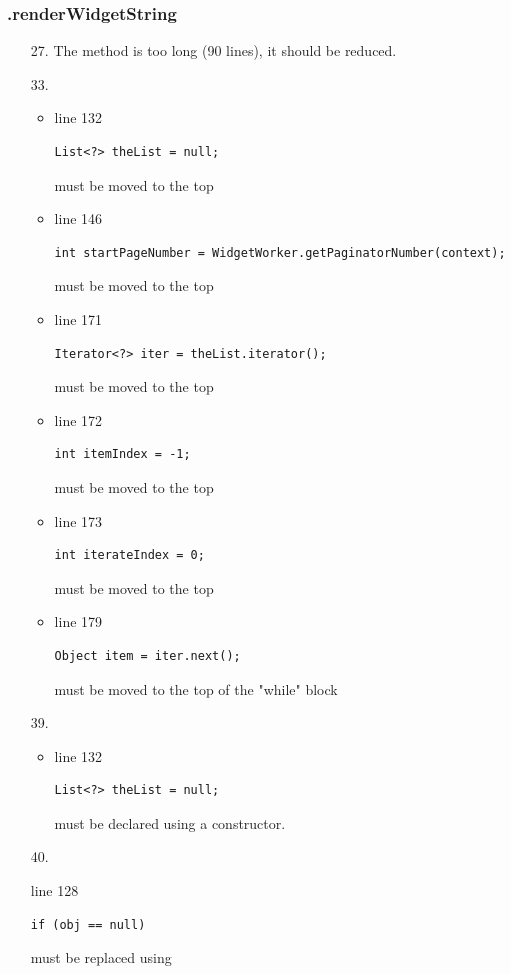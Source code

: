 \documentclass[english]{article}
\begin{document}
\subsubsection*{.renderWidgetString}
\begin{itemize}
	\item[27.]{The method is too long (90 lines), it should be reduced.
}
		\item[33.]{ 
			\begin{itemize}
				\item{line 132
						\begin{lstlisting}
List<?> theList = null;
						\end{lstlisting} must be moved to the top}
				\item{line 146
						\begin{lstlisting}
int startPageNumber = WidgetWorker.getPaginatorNumber(context);
						\end{lstlisting} must be moved to the top}
				\item{line 171
						\begin{lstlisting}
Iterator<?> iter = theList.iterator();
						\end{lstlisting} must be moved to the top}
				\item{line 172
						\begin{lstlisting}
int itemIndex = -1;
						\end{lstlisting} must be moved to the top}
				\item{line 173
						\begin{lstlisting}
int iterateIndex = 0;
						\end{lstlisting} must be moved to the top}
				\item{line 179
						\begin{lstlisting}
Object item = iter.next();
						\end{lstlisting} must be moved to the top of the "while" block}
			\end{itemize}
		}
		\item[39.]{ 
			\begin{itemize}
				\item{line 132
						\begin{lstlisting}
List<?> theList = null;
						\end{lstlisting} must be declared using a constructor.}
			\end{itemize}
}
	\item[40.]{ line 128
		\begin{lstlisting}
if (obj == null)
		\end{lstlisting} must be replaced using
}
\end{itemize}
\end{document}
